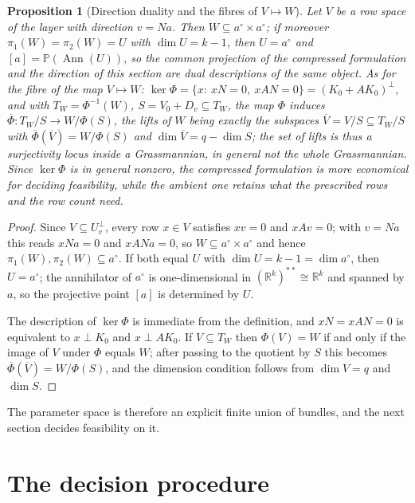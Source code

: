 \documentclass[journal]{IEEEtran}
\theoremstyle{plainn}
\newtheorem{prop}{Proposition}
\theoremstyle{remark}
\newcommand{\Ann}{\operatorname{Ann}}
\begin{document}
\begin{prop}[Direction duality and the fibres of $V\mapsto W$]
\label{sec3:prop:duality}
\label{sec3:prop:fibres}
\label{sec3:rem:noalternative}
Let $V$ be a row space of the layer with direction $v=Na$. Then $W\subseteq a^\circ\times a^\circ$; if
moreover $\pi_1(W)=\pi_2(W)=U$ with $\dim U=k-1$, then $U=a^\circ$ and
$[a]=\mathbb{P}(\Ann(U))$, so the common projection of the compressed formulation and the direction of
this section are dual descriptions of the same object. As for the fibre of the map $V\mapsto W$:
$\ker\Phi=\{x:\ xN=0,\ xAN=0\}=(K_0+AK_0)^\perp$, and with $T_W=\Phi^{-1}(W)$, $S=V_0+D_v\subseteq T_W$,
the map $\Phi$ induces $\overline{\Phi}\colon T_W/S\to W/\Phi(S)$, the lifts of $W$ being exactly the
subspaces $\overline{V}=V/S\subseteq T_W/S$ with $\overline{\Phi}(\overline{V})=W/\Phi(S)$ and
$\dim\overline{V}=q-\dim S$; the set of lifts is thus a \emph{surjectivity locus} inside a
Grassmannian, in general not the whole Grassmannian. Since $\ker\Phi$ is in general nonzero, the
compressed formulation is more economical for deciding feasibility, while the ambient one retains what
the prescribed rows and the row count need.
\end{prop}
\begin{proof}
Since $V\subseteq U_v^\perp$, every row $x\in V$ satisfies $xv=0$ and $xAv=0$; with $v=Na$ this reads
$xNa=0$ and $xANa=0$, so $W\subseteq a^\circ\times a^\circ$ and hence
$\pi_1(W),\pi_2(W)\subseteq a^\circ$. If both equal $U$ with $\dim U=k-1=\dim a^\circ$, then
$U=a^\circ$; the annihilator of $a^\circ$ is one-dimensional in $(\mathbb{R}^k)^{**}\cong\mathbb{R}^k$
and spanned by $a$, so the projective point $[a]$ is determined by $U$.

The description of $\ker\Phi$ is immediate from the definition, and $xN=xAN=0$ is equivalent to
$x\perp K_0$ and $x\perp AK_0$. If $V\subseteq T_W$ then $\Phi(V)=W$ if and only if the image of $V$
under $\Phi$ equals $W$; after passing to the quotient by $S$ this becomes
$\overline\Phi(\overline V)=W/\Phi(S)$, and the dimension condition follows from $\dim V=q$ and
$\dim S$.
\end{proof}


The parameter space is therefore an explicit finite union of bundles, and the next section decides
feasibility on it.


\section{The decision procedure}\label{sec4}\label{sec:decision}
\end{document}
